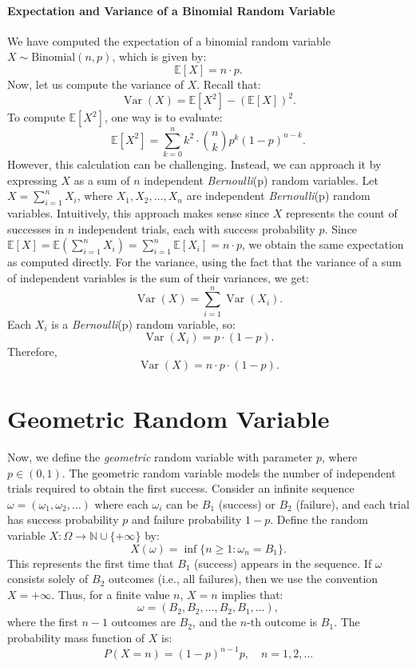 \paragraph{Expectation and Variance of a Binomial Random Variable}

We have computed the expectation of a binomial random variable \( X \sim \text{Binomial}(n, p) \), which is given by:
\[
\mathbb{E}[X] = n \cdot p.
\]
Now, let us compute the variance of \( X \). Recall that:
\[
\operatorname{Var}(X) = \mathbb{E}[X^2] - \left(\mathbb{E}[X]\right)^2.
\]
To compute \( \mathbb{E}[X^2] \), one way is to evaluate:
\[
\mathbb{E}[X^2] = \sum_{k=0}^n k^2 \cdot \binom{n}{k} p^k (1 - p)^{n-k}.
\]
However, this calculation can be challenging. Instead, we can approach it by expressing \( X \) as a sum of \( n \) independent \textit{Bernoulli}(p) random variables. Let \( X = \sum_{i=1}^n X_i \), where \( X_1, X_2, \ldots, X_n \) are independent \textit{Bernoulli}(p) random variables. Intuitively, this approach makes sense since \( X \) represents the count of successes in \( n \) independent trials, each with success probability \( p \). \newline
Since \( \mathbb{E}[X] = \mathbb{E}\left(\sum_{i=1}^n X_i\right) = \sum_{i=1}^n \mathbb{E}[X_i] = n \cdot p \), we obtain the same expectation as computed directly. \newline
For the variance, using the fact that the variance of a sum of independent variables is the sum of their variances, we get:
\[
\operatorname{Var}(X) = \sum_{i=1}^n \operatorname{Var}(X_i).
\]
Each \( X_i \) is a \textit{Bernoulli}(p) random variable, so:
\[
\operatorname{Var}(X_i) = p \cdot (1 - p).
\]
Therefore,
\[
\operatorname{Var}(X) = n \cdot p \cdot (1 - p).
\]

\section{Geometric Random Variable}

Now, we define the \textit{geometric} random variable with parameter \( p \), where \( p \in (0, 1) \). \newline
The geometric random variable models the number of independent trials required to obtain the first success. Consider an infinite sequence \( \omega = (\omega_1, \omega_2, \ldots) \) where each \( \omega_i \) can be \( B_1 \) (success) or \( B_2 \) (failure), and each trial has success probability \( p \) and failure probability \( 1 - p \). \newline
Define the random variable \( X: \Omega \to \mathbb{N} \cup \{+\infty\} \) by:
\[
X(\omega) = \inf \{ n \geq 1 : \omega_n = B_1 \}.
\]
This represents the first time that \( B_1 \) (success) appears in the sequence. If \( \omega \) consists solely of \( B_2 \) outcomes (i.e., all failures), then we use the convention \( X = +\infty \). \newline
Thus, for a finite value \( n \), \( X = n \) implies that:
\[
\omega = (B_2, B_2, \ldots, B_2, B_1, \ldots),
\]
where the first \( n - 1 \) outcomes are \( B_2 \), and the \( n \)-th outcome is \( B_1 \). The probability mass function of \( X \) is:
\[
P(X = n) = (1 - p)^{n - 1} p, \quad n = 1, 2, \dots
\]

